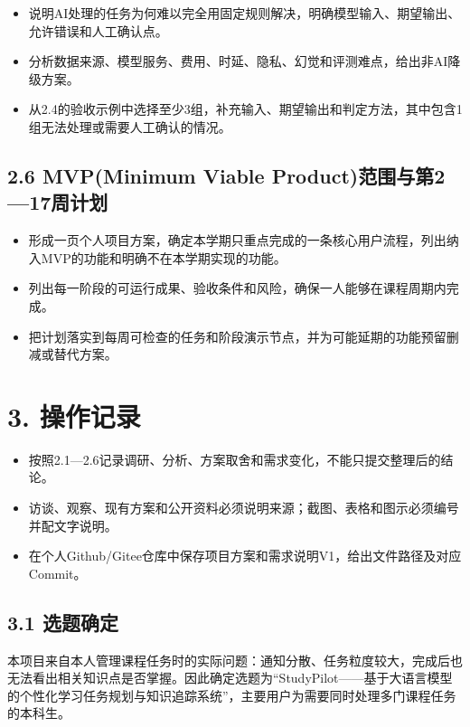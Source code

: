 \documentclass[UTF8,12pt,a4paper]{ctexart}
\begin{document}
\begin{itemize}
  \item 说明AI处理的任务为何难以完全用固定规则解决，明确模型输入、期望输出、允许错误和人工确认点。
  \item 分析数据来源、模型服务、费用、时延、隐私、幻觉和评测难点，给出非AI降级方案。
  \item 从2.4的验收示例中选择至少3组，补充输入、期望输出和判定方法，其中包含1组无法处理或需要人工确认的情况。
\end{itemize}

\subsection*{2.6 MVP(Minimum Viable Product)范围与第2—17周计划}

\begin{itemize}
  \item 形成一页个人项目方案，确定本学期只重点完成的一条核心用户流程，列出纳入MVP的功能和明确不在本学期实现的功能。
  \item 列出每一阶段的可运行成果、验收条件和风险，确保一人能够在课程周期内完成。
  \item 把计划落实到每周可检查的任务和阶段演示节点，并为可能延期的功能预留删减或替代方案。
\end{itemize}

\section*{3. 操作记录}

\begin{itemize}
  \item 按照2.1—2.6记录调研、分析、方案取舍和需求变化，不能只提交整理后的结论。
  \item 访谈、观察、现有方案和公开资料必须说明来源；截图、表格和图示必须编号并配文字说明。
  \item 在个人Github/Gitee仓库中保存项目方案和需求说明V1，给出文件路径及对应Commit。
\end{itemize}

\subsection*{3.1 选题确定}

本项目来自本人管理课程任务时的实际问题：通知分散、任务粒度较大，完成后也无法看出相关知识点是否掌握。因此确定选题为“StudyPilot——基于大语言模型的个性化学习任务规划与知识追踪系统”，主要用户为需要同时处理多门课程任务的本科生。
\end{document}
